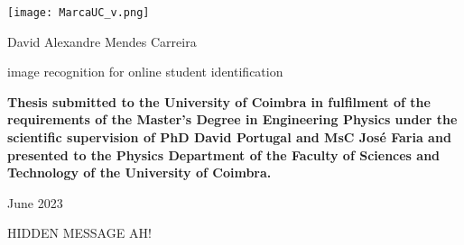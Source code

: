\documentclass[class=report, crop=false, a4paper]{standalone}
\begin{document}

\pagecolor{CoverUC}\afterpage{\nopagecolor}

\begin{center}
    \color{CoverUCTypo}
    \texttt{[image: MarcaUC\_v.png]}
    \vspace{3cm}

    \fontsize{18pt}{18pt}\selectfont
    \par{\ArrusBt David Alexandre Mendes Carreira}
    \vspace{3cm}

    \fontsize{22pt}{22pt}\selectfont
    \par{\ArrusBtScB image recognition for online student identification}
    \fontsize{20pt}{20pt}\selectfont
    \vspace{2cm}

    \vfill
    \fontsize{12pt}{12pt}\selectfont
    \par\textbf{\ArrusBt Thesis submitted to the University of Coimbra in fulfilment of the
    requirements of the Master’s Degree in Engineering Physics
    under the scientific supervision of PhD David Portugal and MsC
    José Faria and presented to the Physics Department of the
    Faculty of Sciences and Technology of the University of Coimbra.}
    
    \vfill
    \fontsize{16pt}{16pt}\selectfont
    \par {\ArrusBt June 2023}
\end{center}
\restoregeometry

\newpage
\color{white}\selectfont
HIDDEN MESSAGE AH!
\newpage
\end{document}
